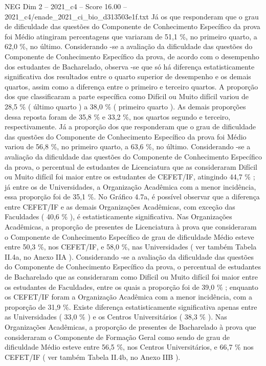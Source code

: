 \begin{textsample}{NEG Dim 2 – 2021\_c4 – Score 16.00 – 2021\_c4/enade\_2021\_ci\_bio\_d313503e1f.txt}
Já os que responderam que o grau de dificuldade das questões do Componente de Conhecimento Específico da prova foi Médio atingiram percentagens que variaram de 51,1 \%, no primeiro quarto, a 62,0 \%, no último.
Considerando -se a avaliação da dificuldade das questões do Componente de Conhecimento Específico da prova, de acordo com o desempenho dos estudantes de Bacharelado, observa -se que só há diferença estatisticamente significativa dos resultados entre o quarto superior de desempenho e os demais quartos, assim como a diferença entre o primeiro e terceiro quartos.
A proporção dos que classificaram a parte específica como Difícil ou Muito difícil variou de 28,5 \% ( último quarto ) a 38,0 \% ( primeiro quarto ).
As demais proporções dessa reposta foram de 35,8 \% e 33,2 \%, nos quartos segundo e terceiro, respectivamente.
Já a proporção dos que responderam que o grau de dificuldade das questões do Componente de Conhecimento Específico da prova foi Médio variou de 56,8 \%, no primeiro quarto, a 63,6 \%, no último.
Considerando -se a avaliação da dificuldade das questões do Componente de Conhecimento Específico da prova, o percentual de estudantes de Licenciatura que as consideraram Difícil ou Muito difícil foi maior entre os estudantes de CEFET/IF, atingindo 44,7 \% ; já entre os de Universidades, a Organização Acadêmica com a menor incidência, essa proporção foi de 35,1 \%.
No Gráfico 4.7a, é possível observar que a diferença entre CEFET/IF e as demais Organizações Acadêmicas, com exceção das Faculdades ( 40,6 \% ), é estatisticamente significativa.
Nas Organizações Acadêmicas, a proporção de presentes de Licenciatura à prova que consideraram o Componente de Conhecimento Específico de grau de dificuldade Médio esteve entre 50,3 \%, nos CEFET/IF, e 58,0 \%, nas Universidades ( ver também Tabela II.4a, no Anexo IIA ).
Considerando -se a avaliação da dificuldade das questões do Componente de Conhecimento Específico da prova, o percentual de estudantes de Bacharelado que as consideraram como Difícil ou Muito difícil foi maior entre os estudantes de Faculdades, entre os quais a proporção foi de 39,0 \% ; enquanto os CEFET/IF foram a Organização Acadêmica com a menor incidência, com a proporção de 31,9 \%.
Existe diferença estatisticamente significativa apenas entre as Universidades ( 33,0 \% ) e os Centros Universitários ( 38,3 \% ).
Nas Organizações Acadêmicas, a proporção de presentes de Bacharelado à prova que consideraram o Componente de Formação Geral como sendo de grau de dificuldade Médio esteve entre 56,5 \%, nos Centros Universitários, e 66,7 \% nos CEFET/IF ( ver também Tabela II.4b, no Anexo IIB ).

\end{textsample}
